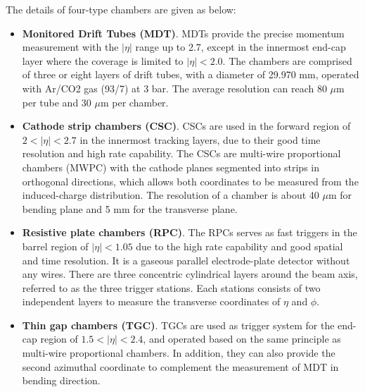 The details of four-type chambers are given as below:
\begin{itemize}
	\item \textbf{Monitored Drift Tubes (MDT)}. MDTs provide the precise momentum measurement with the $|\eta|$ range up to 2.7, except in the innermost end-cap layer where the coverage is limited to $|\eta| < 2.0$. The chambers are comprised of three or eight layers of drift tubes, with a diameter of 29.970 mm, operated with Ar/CO2 gas (93/7) at 3 bar. The average resolution can reach 80 $\mu$m per tube and 30 $\mu$m per chamber.
	\item \textbf{Cathode strip chambers (CSC)}. CSCs are used in the forward region of $2 < |\eta| < 2.7$ in the innermost tracking layers, due to their good time resolution and high rate capability. The CSCs are multi-wire proportional chambers (MWPC) with the cathode planes segmented into strips in orthogonal directions, which allows both coordinates to be measured from the induced-charge distribution. The resolution of a chamber is about 40 $\mu$m for bending plane and 5 mm for the transverse plane.
	\item \textbf{Resistive plate chambers (RPC)}. The RPCs serves as fast triggers in the barrel region of $|\eta| < 1.05$ due to the high rate capability and good spatial and time resolution. It is a gaseous parallel electrode-plate detector without any wires. There are three concentric cylindrical layers around the beam axis, referred to as the three trigger stations. Each stations consists of two independent layers to measure the transverse coordinates of $\eta$ and $\phi$.
	\item \textbf{Thin gap chambers (TGC)}. TGCs are used as trigger system for the end-cap region of $1.5 < |\eta| < 2.4$, and operated based on the same principle as multi-wire proportional chambers. In addition, they can also provide the second azimuthal coordinate to complement the measurement of MDT in bending direction.
\end{itemize}
